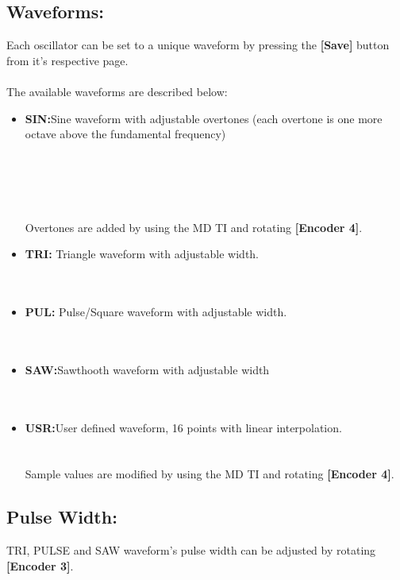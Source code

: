 \subsection{Waveforms:}
Each oscillator can be set to a unique waveform by pressing the \textbf{[Save]} button from it's respective page.\\
\\
The available waveforms are described below:

\begin{itemize}
\item{\textbf{SIN:}}Sine waveform with adjustable overtones (each overtone is one more octave above the fundamental frequency)\\
\\\\
\\\\
\\Overtones are added by using the MD TI and rotating \textbf{[Encoder 4]}.
\item{\textbf{TRI:}} Triangle waveform with adjustable width.\\
\\\\
\item{\textbf{PUL:}} Pulse/Square waveform with adjustable width.\\
\\\\
\item{\textbf{SAW:}}Sawthooth waveform with adjustable width\\
\\\\
\item{\textbf{USR:}}User defined waveform, 16 points with linear interpolation.\\
\\\\
Sample values are modified by using the MD TI and rotating \textbf{[Encoder 4]}.
\end{itemize}
\subsection{Pulse Width:}
TRI, PULSE and SAW waveform's pulse width can be adjusted by rotating \textbf{[Encoder 3]}.\\
\\
\newpage
